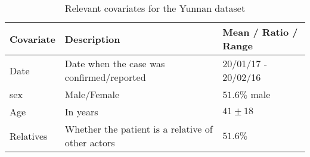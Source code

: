 \begin{table}
	\begin{mdframed}
		\begin{tabularx}{\linewidth}{XXX}
		\hline
		\hline
		\textbf{Covariate} & \textbf{Description} & \textbf{Mean / Ratio / Range}\\
		\hline
		Date & Date when the case was confirmed/reported & 20/01/17 - 20/02/16\\
		\hline
		sex & Male/Female & $51.6\%$ male\\
		\hline
		Age & In years & $41\pm18$ \\
		\hline
		Relatives & Whether the patient is a relative of other actors & $51.6\%$ \\
		\hline
		\hline
	\end{tabularx}
	\caption{Relevant covariates for the Yunnan dataset}
	\label{tab:yunnan_covariates}
	\end{mdframed}
\end{table}

